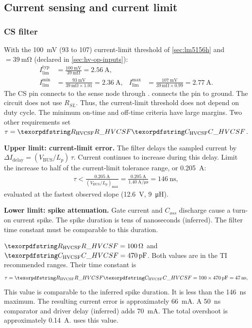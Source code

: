 \subsection{Current sensing and current limit}\label{sec:hv-cs}

\subsubsection{CS filter}\label{sec:hv-cs-filter}

With the \SI{100}{\milli\volt} (93 to 107) current-limit threshold of
\cref{sec:lm5156h} and  $= \SI{39}{\milli\ohm}$ (declared in
\cref{sec:hv-op-inputs}):
\begin{align*}
  I_{\mathrm{lim}}^{\mathrm{typ}} &= \frac{\SI{100}{\milli\volt}}{\SI{39}{\milli\ohm}}
    = \SI{2.56}{\ampere},\\
  I_{\mathrm{lim}}^{\min} &= \frac{\SI{93}{\milli\volt}}{39\,\si{\milli\ohm}\times1.01}
    = \SI{2.36}{\ampere}, &
  I_{\mathrm{lim}}^{\max} &= \frac{\SI{107}{\milli\volt}}{39\,\si{\milli\ohm}\times0.99}
    = \SI{2.77}{\ampere}.
\end{align*}
The CS pin connects to the sense node through .
 connects the pin to ground. The circuit does not use $R_{SL}$.
Thus, the current-limit threshold does not depend on duty cycle. The minimum
on-time and off-time criteria have large margins. Two other requirements set
$\tau = \des{R}{HVCSF}\des{C}{HVCSF}$.

\textbf{Upper limit: current-limit error.} The filter delays the sampled current
by $\Delta I_{\mathrm{delay}} = (V_{\mathrm{BUS}}/L_p)\,\tau$. Current continues
to increase during this delay. Limit the increase to half of the current-limit
tolerance range, or \SI{0.205}{\ampere}:
\begin{align*}
  \tau < \frac{\SI{0.205}{\ampere}}{(V_{\mathrm{BUS}}/L_p)_{\max}}
       = \frac{\SI{0.205}{\ampere}}{\SI{1.40}{\ampere\per\micro\second}}
       = \SI{146}{\nano\second},
\end{align*}
evaluated at the fastest observed slope (\SI{12.6}{\volt}, \SI{9}{\micro\henry}).

\textbf{Lower limit: spike attenuation.} Gate current and $C_{oss}$ discharge
cause a turn-on current spike. The spike duration is tens of nanoseconds
(inferred). The filter time constant must be comparable to this duration.

$\des{R}{HVCSF} = \SI{100}{\ohm}$ and
$\des{C}{HVCSF} = \SI{470}{\pico\farad}$. Both values are in the TI
recommended ranges. Their time constant is
\begin{align*}
  \tau = \des{R}{HVCSF}\des{C}{HVCSF} = 100 \times 470\,\si{\pico\farad} = \SI{47}{\nano\second},
\end{align*}
This value is comparable to the inferred spike duration. It is less than the
\SI{146}{\nano\second} maximum. The resulting current error is approximately
\SI{66}{\milli\ampere}. A \SI{50}{\nano\second} comparator and driver delay
(inferred) adds \SI{70}{\milli\ampere}. The total overshoot is approximately
\SI{0.14}{\ampere}.
 uses this value.

